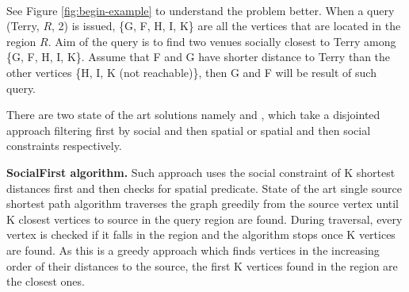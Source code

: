 \quad{}\\

\fi

See Figure \ref{fig:begin-example} to understand the problem better. When a query {\query}(Terry, $R$, 2) is issued, \{G, F, H, I, K\} are all the vertices that are located in the region $R$. Aim of the query is to find two venues socially closest to Terry among \{G, F, H, I, K\}. Assume that F and G have shorter distance to Terry than the other vertices \{H, I, K (not reachable)\}, then G and F will be result of such {\query} query.


There are two state of the art solutions namely {\socialfirst} and {\spatialfirst}, which take a disjointed approach filtering first by social and then spatial or spatial and then social constraints respectively. 

\textbf{SocialFirst algorithm.} Such approach uses the social constraint of K shortest distances first and then checks for spatial predicate. State of the art single source shortest path algorithm traverses the graph greedily from the source vertex until K closest vertices to source in the query region are found. During traversal, every vertex is checked if it falls in the region and the algorithm stops once K vertices are found. As this is a greedy approach which finds vertices in the increasing order of their distances to the source, the first K vertices found in the region are the closest ones.


